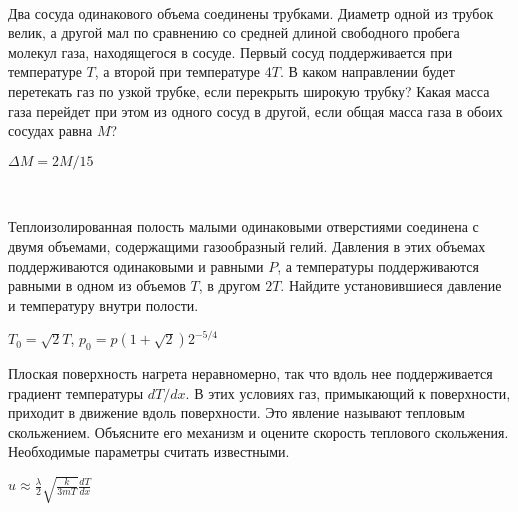 \begin{ex}
\hspace{0pt} \\
\begin{minipage}{.65\textwidth}
Два сосуда одинакового объема соединены трубками. Диаметр одной из трубок велик, 
а другой мал по сравнению со средней длиной свободного пробега молекул газа, находящегося в сосуде. 
Первый сосуд поддерживается при температуре $T$, а второй при температуре $4T$. 
В каком направлении будет перетекать газ по узкой трубке, если перекрыть широкую трубку? 
Какая масса газа перейдет при этом из одного сосуд в другой, если общая масса газа в обоих сосудах равна $M$?
\end{minipage}
\begin{minipage}{.35\textwidth}
\centering

\end{minipage}
\begin{ans}
$\Delta M = 2M/15$
\end{ans}
\end{ex}

\begin{samepage}
\begin{ex}
\hspace{0pt} \\
\begin{minipage}{.65\textwidth}
Теплоизолированная полость малыми одинаковыми отверстиями соединена с двумя объемами, содержащими газообразный гелий. 
Давления в этих объемах поддерживаются одинаковыми и равными $P$, а температуры поддерживаются равными в одном из объемов $T$, в другом $2T$. 
Найдите установившиеся давление и температуру внутри полости.
\end{minipage}
\begin{minipage}{.35\textwidth}
\centering

\end{minipage}
\begin{ans}
$T_0 = \sqrt{2}T$, $p_0=p(1+\sqrt{2})2^{-5/4}$
\end{ans}
\end{ex}
\end{samepage}

\begin{ex}
Плоская поверхность нагрета неравномерно, так что вдоль нее поддерживается градиент температуры $dT/dx$. 
В этих условиях газ, примыкающий к поверхности, приходит в движение вдоль поверхности. Это явление называют тепловым скольжением. 
Объясните его механизм и оцените скорость теплового скольжения. Необходимые параметры считать известными.
\begin{ans}
$u \approx \frac{\lambda}{2}\sqrt{\frac{k}{3mT}}\frac{dT}{dx}$
\end{ans}
\end{ex}


